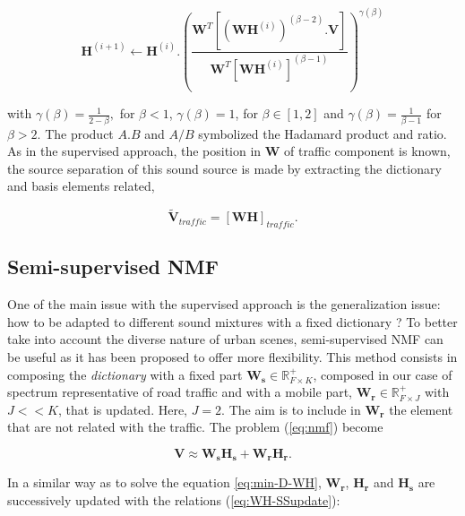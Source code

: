 \documentclass[twocolumn,a4paper,10pt]{article}
\begin{document}
\begin{equation}\label{eq:updateH_Sup}
\textbf{H}^{(i+1)} \leftarrow \textbf{H}^{(i)}.\left(\frac{\textbf{W}^T \left[\left(\textbf{WH}^{(i)} \right)^{(\beta-2)}.\textbf{V} \right]}{\textbf{W}^T \left[\textbf{WH}^{(i)} \right]^{(\beta-1)}}\right)^{\gamma(\beta)}
\end{equation}

with $\gamma(\beta) = \frac{1}{2-\beta},$ for $\beta < 1$, $ \gamma(\beta) = 1$, for $\beta \in \left[1,2\right]$ and $\gamma(\beta) = \frac{1}{\beta-1}$ for $\beta > 2$. The product $A.B$ and $A/B$ symbolized the Hadamard product and ratio. As in the supervised approach, the position in $\mathbf{W}$ of traffic component is known, the source separation of this sound source is made by extracting the dictionary and basis elements related, 

\begin{equation}\label{eq:separationExtraction}
\mathbf{\tilde{V}}_{traffic} = \left[ \mathbf{WH} \right]_{traffic}.
\end{equation}

\subsection{Semi-supervised NMF}

One of the main issue with the supervised approach is the generalization issue: how to be adapted to different sound mixtures with a fixed dictionary ? To better take into account the diverse nature of urban scenes, semi-supervised NMF can be useful as it has been proposed \cite{lee_semi-supervised_2010} to offer more flexibility. This method consists in composing the \textit{dictionary} with a fixed part $\mathbf{W_s} \in \mathbb{R}^+_{F\times K}$, composed in our case of spectrum representative of road traffic and with a mobile part, $\mathbf{W_r} \in \mathbb{R}^+_{F\times J}$ with $J <<K$, that is updated. Here, $J = 2$. The aim is to include in $\mathbf{W_r}$ the element that are not related with the traffic. The problem (\ref{eq:nmf}) become

\begin{equation}
\mathbf{V} \approx \mathbf{W_s H_s}+ \mathbf{W_r H_r}.
\end{equation}

In a similar way as to solve the equation \ref{eq:min-D-WH}, $\mathbf{W_r}$, $\mathbf{H_r}$ and $\mathbf{H_s}$ are successively updated with the relations (\ref{eq:WH-SSupdate}):
\end{document}
